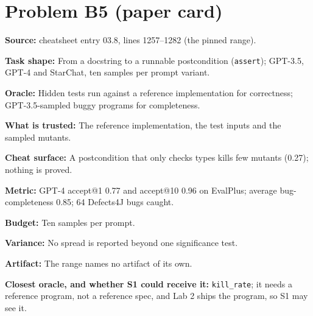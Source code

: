 \documentclass[11pt]{article}
\begin{document}
\section*{Problem B5 (paper card)}\label{ans:B5}
\begin{answer}
\textbf{Source:} cheatsheet entry 03.8, lines 1257--1282 (the pinned range).

\textbf{Task shape:} From a docstring to a runnable postcondition
(\texttt{assert}); GPT-3.5, GPT-4 and StarChat, ten samples per prompt variant.

\textbf{Oracle:} Hidden tests run against a reference implementation for
correctness; GPT-3.5-sampled buggy programs for completeness.

\textbf{What is trusted:} The reference implementation, the test inputs and
the sampled mutants.

\textbf{Cheat surface:} A postcondition that only checks types kills few
mutants (0.27); nothing is proved.

\textbf{Metric:} GPT-4 accept@1 0.77 and accept@10 0.96 on EvalPlus; average
bug-completeness 0.85; 64 Defects4J bugs caught.

\textbf{Budget:} Ten samples per prompt.

\textbf{Variance:} No spread is reported beyond one significance test.

\textbf{Artifact:} The range names no artifact of its own.

\textbf{Closest oracle, and whether S1 could receive it:} \texttt{kill\_rate};
it needs a reference program, not a reference spec, and Lab 2 ships the
program, so S1 may see it.
\end{answer}
\end{document}
